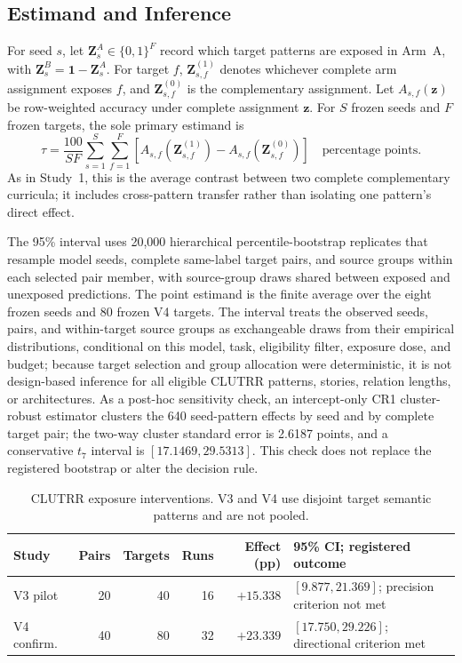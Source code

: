 \subsection{Estimand and Inference}

For seed $s$, let $\mathbf Z_s^A\in\{0,1\}^{F}$ record which target patterns
are exposed in Arm~A, with
$\mathbf Z_s^B=\mathbf 1-\mathbf Z_s^A$.  For target $f$,
$\mathbf Z_{s,f}^{(1)}$ denotes whichever complete arm assignment exposes
$f$, and $\mathbf Z_{s,f}^{(0)}$ is the complementary assignment.  Let
$A_{s,f}(\mathbf z)$ be row-weighted accuracy under complete assignment
$\mathbf z$.  For $S$ frozen seeds and $F$ frozen targets, the sole primary
estimand is
\begin{equation}
\tau
=
\frac{100}{SF}
\sum_{s=1}^{S}\sum_{f=1}^{F}
\left[
A_{s,f}(\mathbf Z_{s,f}^{(1)})
-A_{s,f}(\mathbf Z_{s,f}^{(0)})
\right]
\quad\text{percentage points}.
\label{eq:clutrr-exposure-estimand}
\end{equation}
As in Study~1, this is the average contrast between two complete
complementary curricula; it includes cross-pattern transfer rather than
isolating one pattern's direct effect.

The 95\% interval uses 20,000 hierarchical percentile-bootstrap replicates
that resample model seeds, complete same-label target pairs, and source
groups within each selected pair member, with source-group draws shared
between exposed and unexposed predictions.  The point estimand is the
finite average over the eight frozen seeds and 80 frozen V4 targets.  The
interval treats the observed seeds, pairs, and within-target source groups
as exchangeable draws from their empirical distributions, conditional on
this model, task, eligibility filter, exposure dose, and budget; because
target selection and group allocation were deterministic, it is not
design-based inference for all eligible CLUTRR patterns, stories, relation
lengths, or architectures.  As a post-hoc sensitivity check, an
intercept-only CR1 cluster-robust estimator clusters the 640 seed-pattern
effects by seed and by complete target pair; the two-way cluster standard
error is 2.6187 points, and a conservative $t_7$ interval is
$[17.1469,29.5313]$.  This check does not replace the registered bootstrap
or alter the decision rule.

\begin{table}[t]
\caption{CLUTRR exposure interventions.  V3 and V4 use disjoint target
semantic patterns and are not pooled.}
\label{tab:clutrr-external-validation}
\centering
\scriptsize
\setlength{\tabcolsep}{3pt}
\begin{tabular}{lrrrrL{1.55in}}
\toprule
Study & Pairs & Targets & Runs & Effect (pp) &
95\% CI; registered outcome \\
\midrule
V3 pilot & 20 & 40 & 16 & $+15.338$ &
$[9.877,21.369]$; precision criterion not met \\
V4 confirm. & 40 & 80 & 32 & $+23.339$ &
$[17.750,29.226]$; directional criterion met \\
\bottomrule
\end{tabular}
\end{table}


